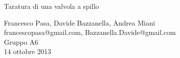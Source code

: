 \begin{center}

	\vspace{0.5cm}
     	{\huge Taratura di una valvola a spillo}
	\vspace{0.5cm}

      	{\large Francesco Pasa, Davide Bazzanella, Andrea Miani} \\
      	{francescopasa@gmail.com, Bazzanella.Davide@gmail.com} \\
		{\large Gruppo A6} \\
	
	\vspace{0.3cm}
      	{\large 14 ottobre 2013}
    
    \vspace{0cm}

\end{center}
